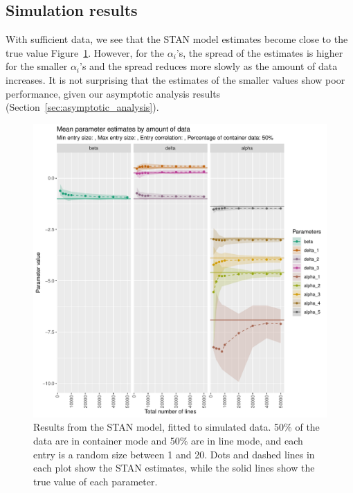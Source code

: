\documentclass[aoas]{imsart}
\begin{document}

\subsection{Simulation results}
With sufficient data, we see that the STAN model estimates become close to the true value Figure~\ref{fig:simulation_estimation}. However, for the \(\alpha_i\)'s, the spread of the estimates is higher for the smaller \(\alpha_i\)'s and the spread reduces more slowly as the amount of data increases. It is not surprising that the estimates of the smaller values show poor performance, given our asymptotic analysis results (Section~\ref{sec:asymptotic_analysis}).  

\begin{figure}[h!]
\includegraphics[width=\textwidth]{../visualisations/new_figures/simulation_estimates_random_effect_quantiles.pdf}
\caption{Results from the STAN model, fitted to simulated data. 50\% of the data are in container mode and 50\% are in line mode, and each entry is a random size between 1 and 20. Dots and dashed lines in each plot show the STAN estimates, while the solid lines show the true value of each parameter.}
\label{fig:simulation_estimation}
\end{figure}
\end{document}
